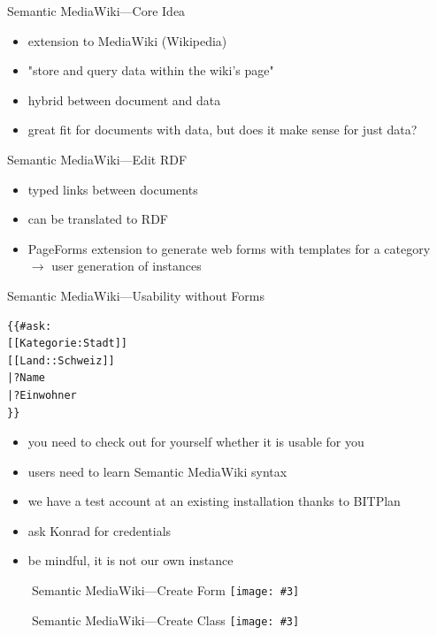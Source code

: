 \documentclass[aspectratio=1610]{beamer}
\newcommand{\imageslide}[4][]
{
\begin{frame}[plain]{~~~~#2}
\vspace{0.2em}
\centering\texttt{[image: \#3]}
\\#1
\note{#4}
\end{frame}
}
\begin{document}
\begin{frame}{Semantic MediaWiki---Core Idea}
\begin{itemize}
\item extension to MediaWiki (Wikipedia)
\item "store and query data within the wiki's page" 
\item hybrid between document and data
\item great fit for documents with data, but does it make sense for just data?
\end{itemize}
\end{frame}

\begin{frame}{Semantic MediaWiki---Edit RDF}
\begin{itemize}
\item typed links between documents
\item can be translated to RDF
\item PageForms extension to generate web forms with templates for a category $\rightarrow$ user generation of instances
\end{itemize}
\end{frame}

\begin{frame}[fragile]{Semantic MediaWiki---Usability without Forms}
\begin{verbatim}
{{#ask:
[[Kategorie:Stadt]]
[[Land::Schweiz]]
|?Name
|?Einwohner
}}
\end{verbatim}
\begin{itemize}
\item you need to check out for yourself whether it is usable for you
\item users need to learn Semantic MediaWiki syntax
\item we have a test account at an existing installation thanks to BITPlan
\item ask Konrad for credentials
\item be mindful, it is not our own instance
\end{itemize}
\end{frame}

\imageslide{Semantic MediaWiki---Create Form}{img/smw-create-form.png}{}{}
\imageslide{Semantic MediaWiki---Create Class}{img/smw-create-class.png}{}{}
\end{document}
